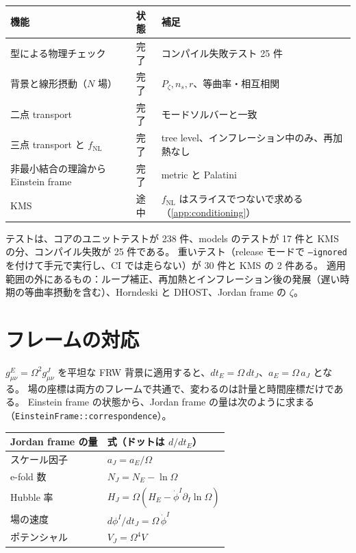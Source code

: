 \documentclass[a4paper,11pt]{ltjsarticle}
\newcommand{\fnl}{f_{\mathrm{NL}}}
\newcommand{\code}[1]{\texttt{#1}}
\begin{document}
\begin{center}
\small
\begin{tabular}{lll}
\toprule
機能 & 状態 & 補足 \\
\midrule
型による物理チェック & 完了 & コンパイル失敗テスト 25 件 \\
背景と線形摂動（$N$ 場） & 完了 & $P_\zeta, n_s, r$、等曲率・相互相関 \\
二点 transport & 完了 & モードソルバーと一致 \\
三点 transport と $\fnl$ & 完了 & tree level、インフレーション中のみ、再加熱なし \\
非最小結合の理論から Einstein frame & 完了 & metric と Palatini \\
KMS & 途中 & $\fnl$ はスライスでつないで求める（\ref{app:conditioning}） \\
\bottomrule
\end{tabular}
\end{center}
テストは、コアのユニットテストが 238 件、models のテストが 17 件と KMS の分、コンパイル失敗が 25 件である。
重いテスト（release モードで \code{--ignored} を付けて手元で実行し、CI では走らない）が 30 件と KMS の 2 件ある。
適用範囲の外にあるもの：ループ補正、再加熱とインフレーション後の発展（遅い時期の等曲率摂動\cite{SSK2014}を含む）、Horndeski と DHOST\cite{ZGB2014,LangloisNoui2016,BLN2016}、Jordan frame の $\zeta$\cite{WMS2012}。
\appendix

\section{フレームの対応}
\label{app:frames}

$g^E_{\mu\nu}=\Omega^2g^J_{\mu\nu}$ を平坦な FRW 背景に適用すると、$dt_E=\Omega\,dt_J$、$a_E=\Omega\,a_J$ となる。
場の座標は両方のフレームで共通で、変わるのは計量と時間座標だけである。
Einstein frame の状態から、Jordan frame の量は次のように求まる（\code{EinsteinFrame::correspondence}）。
\begin{center}
\begin{tabular}{ll}
\toprule
Jordan frame の量 & 式（ドットは $d/dt_E$） \\
\midrule
スケール因子 & $a_J=a_E/\Omega$ \\
e-fold 数 & $N_J=N_E-\ln\Omega$ \\
Hubble 率 & $H_J=\Omega\left(H_E-\dot\phi^I\partial_I\ln\Omega\right)$ \\
場の速度 & $d\phi^I/dt_J=\Omega\,\dot\phi^I$ \\
ポテンシャル & $V_J=\Omega^4V$ \\
\bottomrule
\end{tabular}
\end{center}
\end{document}
